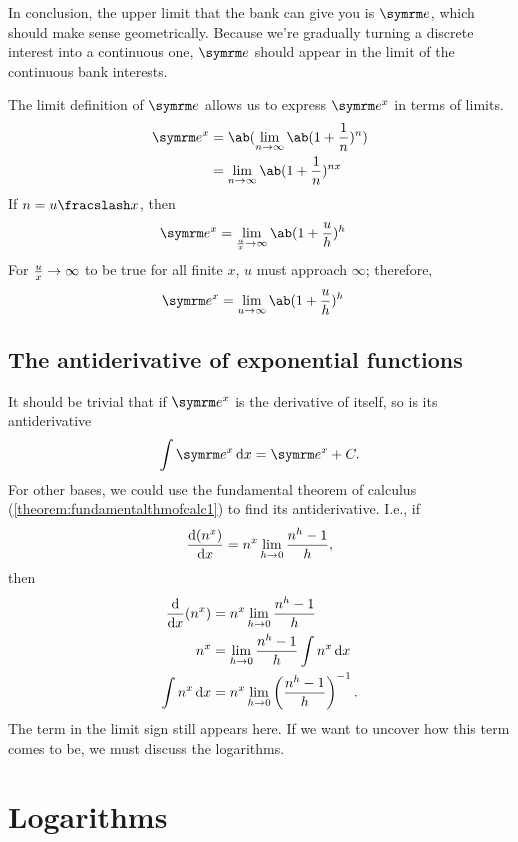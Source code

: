 In conclusion, the upper limit that the bank can give you is $\e$, which should make sense geometrically. Because we're gradually turning a discrete interest into a continuous one, $\e$ should appear in the limit of the continuous bank interests.

The limit definition of $\e$ allows us to express $\e^x$ in terms of limits.
\begin{align}
	\e^x &= \ab(\lim_{n \appr \infty}\ab(1 + \frac{1}{n})^n) \\
		 &= \lim_{n \appr \infty}\ab(1 + \frac{1}{n})^{nx}
\end{align}
If $n = \flatfrac{u}{x}$, then
\begin{align}
	\e^x &= \lim_{\frac{u}{x} \appr \infty}\ab(1 + \frac{u}{h})^{h}
\end{align}
For $\frac{u}{x} \rightarrow \infty$ to be true for all finite $x$, $u$ must approach $\infty$; therefore,
\begin{align}
	\e^x &= \lim_{u \appr \infty}\ab(1 + \frac{u}{h})^h
\end{align}

\subsection{The antiderivative of exponential functions}

It should be trivial that if $\e^x$ is the derivative of itself, so is its antiderivative
\begin{equation}
    \int \e^x \odif{x} = \e^x + C.
\end{equation}
For other bases, we could use the fundamental theorem of calculus (\cref{theorem:fundamentalthmofcalc1}) to find its antiderivative. I.e., if
\begin{equation*}
    \odv{(n^x)}{x} = n^x\lim_{h \appr 0}\frac{n^h - 1}{h},
\end{equation*}
then
\begin{align*}
    \odv*{(n^x)}{x} &= n^x\lim_{h \appr 0}\frac{n^h - 1}{h} \\
    n^x &= \lim_{h \appr 0}\frac{n^h - 1}{h}\int n^x\odif{x} \\
    \int n^x\odif{x} &= n^x\lim_{h \appr 0}\left(\frac{n^h - 1}{h}\right)^{-1}.
\end{align*}
The term in the limit sign still appears here. If we want to uncover how this term comes to be, we must discuss the logarithms.

\section{Logarithms}

